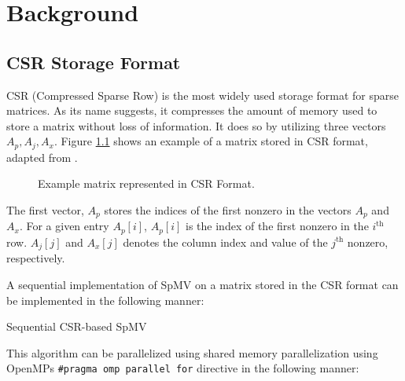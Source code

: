 \chapter{Background}

\section{CSR Storage Format}
CSR (Compressed Sparse Row) is the most widely used storage format for sparse matrices. As its name suggests, it compresses the amount of memory used to store a matrix without loss of information. It does so by utilizing three vectors \(A_{p}, A_{j}, A_{x}\). Figure \ref{fig:csrformat} shows an example of a matrix stored in CSR format, adapted from \cite{gupta2024gamgi}.



\begin{figure}[ht]
    \centering
    \caption{Example matrix represented in CSR Format.}
    \label{fig:csrformat}
\end{figure}


The first vector, \(A_{p}\) stores the indices of the first nonzero in the vectors \(A_{p}\) and \(A_{x}\). For a given entry \(A_{p}[i]\), \(A_{p}[i]\) is the index of the first nonzero in the \(i^{\text{th}}\) row. \(A_{j}[j]\) and \(A_{x}[j]\) denotes the column index and value of the \(j^{\text{th}}\) nonzero, respectively.
\medskip

A sequential implementation of SpMV on a matrix stored in the CSR format can be implemented in the following manner:
\medskip

\begin{algorithm}[H]
    \caption{Sequential CSR-based SpMV}
    \SetAlgoVlined

\end{algorithm}
\medskip

This algorithm can be parallelized using shared memory parallelization using OpenMPs \texttt{\#pragma omp parallel for} directive in the following manner:
\medskip

